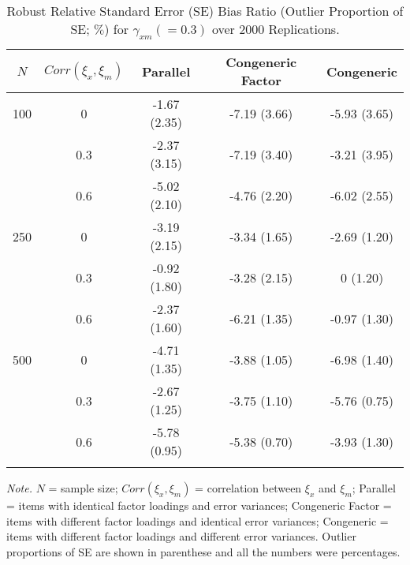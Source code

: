 \documentclass[
  man]{apa6}
\begin{document}
\begin{table}[tbp]

\begin{center}
\begin{threeparttable}

\caption{\label{tab:MAD relative SE bias with outliers proportion}Robust Relative Standard Error (SE) Bias Ratio (Outlier Proportion of SE; $\%$) for $\gamma_{xm} (= 0.3)$ over 2000 Replications.}

\begin{tabular}{ccccc}
\toprule
$\textit{N}$ & \multicolumn{1}{c}{$Corr(\xi_{x}, \xi_{m})$} & \multicolumn{1}{c}{Parallel} & \multicolumn{1}{c}{Congeneric Factor} & \multicolumn{1}{c}{Congeneric}\\
\midrule
100 & 0 & -1.67 (2.35) & -7.19 (3.66) & -5.93 (3.65)\\
 & 0.3 & -2.37 (3.15) & -7.19 (3.40) & -3.21 (3.95)\\
 & 0.6 & -5.02 (2.10) & -4.76 (2.20) & -6.02 (2.55)\\
250 & 0 & -3.19 (2.15) & -3.34 (1.65) & -2.69 (1.20)\\
 & 0.3 & -0.92 (1.80) & -3.28 (2.15) & 0 (1.20)\\
 & 0.6 & -2.37 (1.60) & -6.21 (1.35) & -0.97 (1.30)\\
500 & 0 & -4.71 (1.35) & -3.88 (1.05) & -6.98 (1.40)\\
 & 0.3 & -2.67 (1.25) & -3.75 (1.10) & -5.76 (0.75)\\
 & 0.6 & -5.78 (0.95) & -5.38 (0.70) & -3.93 (1.30)\\
\bottomrule
\addlinespace
\end{tabular}

\begin{tablenotes}[para]
\normalsize{\textit{Note.} $\textit{N}$ = sample size; $Corr(\xi_{x}, \xi_{m})$ = correlation between $\xi_{x}$ and $\xi_{m}$; Parallel = items with identical factor loadings and error variances; Congeneric Factor = items with different factor loadings and identical error variances; Congeneric = items with different factor loadings and different error variances. Outlier proportions of SE are shown in parenthese and all the numbers were percentages.}
\end{tablenotes}

\end{threeparttable}
\end{center}

\end{table}
\end{document}
